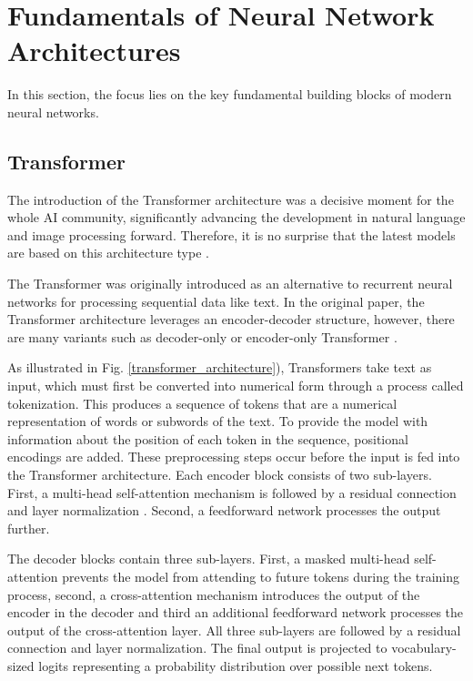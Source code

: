 \section{Fundamentals of Neural Network Architectures}
\label{sec:FundNNA}
In this section, the focus lies on the key fundamental building blocks of modern neural networks. 

\subsection{Transformer}
The introduction of the Transformer architecture \cite{AttentionIsAllYouNeed} was a decisive moment for the whole \gls{AI} community, significantly advancing the development in natural language and image processing forward. Therefore, it is no surprise that the latest models are based on this architecture type \cite{Claude, Gemini, Flux, HiDream}. 

The Transformer was originally introduced as an alternative to recurrent neural networks  \cite{RNN} for processing sequential data like text. In the original paper, the Transformer architecture leverages an encoder-decoder structure, however, there are many variants such as decoder-only \cite{GPT4, Lama} or encoder-only Transformer \cite{BERT}. 

As illustrated in Fig. \ref{transformer_architecture}), Transformers take text as input, which must first be converted into numerical form through a process called tokenization. This produces a sequence of tokens that are a numerical representation of words or subwords of the text. To provide the model with information about the position of each token in the sequence, positional encodings are added. These preprocessing steps occur before the input is fed into the Transformer architecture. 
Each encoder block consists of two sub-layers. First, a multi-head self-attention mechanism is followed by a residual connection \cite{ResidualConnection} and layer normalization \cite{LayerNorm}. Second, a feedforward network processes the output further. 

The decoder blocks contain three sub-layers. First, a masked multi-head self-attention prevents the model from attending to future tokens during the training process, second, a cross-attention mechanism introduces the output of the encoder in the decoder and third an additional feedforward network processes the output of the cross-attention layer. All three sub-layers are followed by a residual connection and layer normalization. The final output is projected to vocabulary-sized logits representing a probability distribution over possible next tokens.



